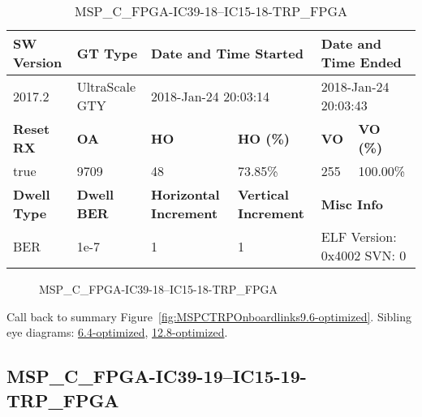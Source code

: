 \begin{table}[h]
\centering
\caption{MSP\_C\_FPGA-IC39-18--IC15-18-TRP\_FPGA}
\label{tab:MSPCFPGAIC3918IC1518TRPFPGA9.6-optimized}
\begin{tabular}{@{}|l|l|l|l|l|l|@{}}
\toprule
\textbf{SW Version}                & \textbf{GT Type}   & \multicolumn{2}{l|}{\textbf{Date and Time Started}}            & \multicolumn{2}{l|}{\textbf{Date and Time Ended}}        \\ \midrule
2017.2                       & UltraScale GTY          & \multicolumn{2}{l|}{2018-Jan-24 20:03:14}                   & \multicolumn{2}{l|}{2018-Jan-24 20:03:43}               \\ \midrule
\textbf{Reset RX}                  & \textbf{OA} & \textbf{HO}   & \textbf{HO (\%)} & \textbf{VO} & \textbf{VO (\%)} \\ \midrule
true & 9709        & 48          & 73.85\%        & 255        & 100.00\%       \\ \midrule
\textbf{Dwell Type}                & \textbf{Dwell BER} & \textbf{Horizontal Increment} & \textbf{Vertical Increment}    & \multicolumn{2}{l|}{\textbf{Misc Info}}                  \\ \midrule
BER                            & 1e-7        & 1        & 1           & \multicolumn{2}{l|}{ELF Version: 0x4002 SVN: 0}                         \\ \bottomrule
\end{tabular}
\end{table}

\begin{figure}[h]
\caption{MSP\_C\_FPGA-IC39-18--IC15-18-TRP\_FPGA} \label{fig:MSPCFPGAIC3918IC1518TRPFPGA9.6-optimized}
\end{figure}

Call back to summary Figure~\ref{fig:MSPCTRPOnboardlinks9.6-optimized}.
Sibling eye diagrams: \hyperref[sec:MSPCFPGAIC3918IC1518TRPFPGA6.4-optimized]{6.4-optimized}, \hyperref[sec:MSPCFPGAIC3918IC1518TRPFPGA12.8-optimized]{12.8-optimized}.

\clearpage
\newpage


\subsection{MSP\_C\_FPGA-IC39-19--IC15-19-TRP\_FPGA}\label{sec:MSPCFPGAIC3919IC1519TRPFPGA9.6-optimized}


